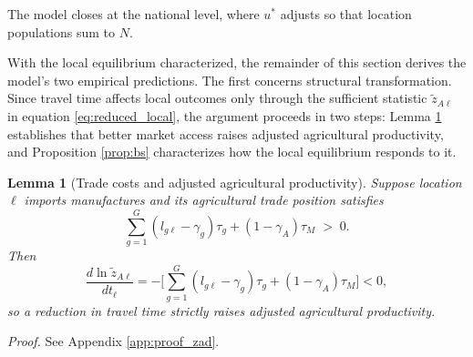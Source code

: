 \documentclass[11pt]{article}
\newtheorem{lemma}{Lemma}
\begin{document}
The model closes at the national level, where $u^\ast$ adjusts so that location populations sum to $N$.

With the local equilibrium characterized, the remainder of this section derives the model's two empirical predictions. The first concerns structural transformation. Since travel time affects local outcomes only through the sufficient statistic $\tilde z_{A\ell}$ in equation \eqref{eq:reduced_local}, the argument proceeds in two steps: Lemma \ref{lem:zad} establishes that better market access raises adjusted agricultural productivity, and Proposition \ref{prop:bs} characterizes how the local equilibrium responds to it.

\begin{lemma}[Trade costs and adjusted agricultural productivity]
\label{lem:zad}
Suppose location $\ell$ imports manufactures and its agricultural trade position satisfies
\begin{equation}
\sum_{g=1}^G \left(l_{g\ell}-\gamma_g\right)\tau_g + (1-\gamma_A)\tau_M \;>\; 0.
\label{eq:net_export}
\end{equation}
Then
\begin{equation}
\frac{d \ln \tilde z_{A\ell}}{d t_\ell}
= -\Big[\sum_{g=1}^G \left(l_{g\ell}-\gamma_g\right)\tau_g + (1-\gamma_A)\tau_M\Big] < 0,
\label{eq:zad_t}
\end{equation}
so a reduction in travel time strictly raises adjusted agricultural productivity.
\end{lemma}

\noindent\emph{Proof.} See Appendix \ref{app:proof_zad}.\medskip
\end{document}
